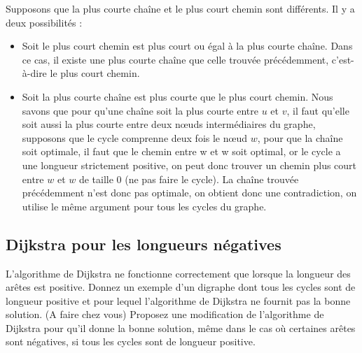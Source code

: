\begin{solution}
  Supposons que la plus courte chaîne et le plus court chemin sont différents. Il y a deux possibilités :
  \begin{itemize}
    \item Soit le plus court chemin est plus court ou égal à la plus courte chaîne. Dans ce cas, il existe une plus courte chaîne que celle trouvée précédemment, c'est-à-dire le plus court chemin.
    \item Soit la plus courte chaîne est plus courte que le plus court chemin.
      Nous savons que pour qu'une chaîne soit la plus courte entre $u$ et $v$,
      il faut qu'elle soit aussi la plus courte entre deux nœuds intermédiaires du graphe,
      supposons que le cycle comprenne deux fois le nœud $w$,
      pour que la chaîne soit optimale, il faut que le chemin entre w et w soit optimal,
      or le cycle a une longueur strictement positive,
      on peut donc trouver un chemin plus court entre $w$ et $w$ de taille 0 (ne pas faire le cycle).
      La chaîne trouvée précédemment n'est donc pas optimale, on obtient donc une contradiction,
      on utilise le même argument pour tous les cycles du graphe.
  \end{itemize}
\end{solution}

\subsection{Dijkstra pour les longueurs négatives} L'algorithme de Dijkstra ne fonctionne correctement que lorsque la longueur des arêtes est positive. Donnez un exemple d'un digraphe dont tous les cycles sont de longueur positive et pour lequel l'algorithme de Dijkstra ne fournit pas la bonne solution. (A faire chez vous) Proposez une modification de l'algorithme de Dijkstra pour qu'il donne la bonne solution, même dans le cas où certaines arêtes sont négatives, si tous les cycles sont de longueur positive.

